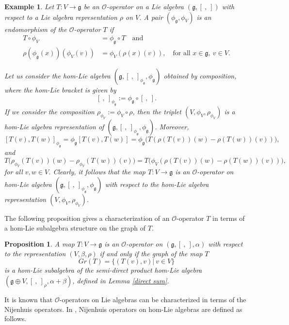 \documentclass[a4paper,11pt]{amsart}
\theoremstyle{plain}
\newtheorem{proposition}[theorem]{Proposition}
\newtheorem{example}[theorem]{Example}
\theoremstyle{definition}
\theoremstyle{remark}
\numberwithin{equation}{section}
\begin{document}
\begin{example}
Let $T:V\rightarrow \mathfrak{g}$ be an $\mathcal{O}$-operator on a Lie algebra $(\mathfrak{g},[~,~])$ with respect to a Lie algebra representation $\rho$ on $V$. A pair $(\phi_{\mathfrak{g}},\phi_V)$ is an endomorphism of the $\mathcal{O}$-operator $T$ if 
\begin{align*}
T\circ \phi_{V}&=\phi_{\mathfrak{g}}\circ T\quad \mbox{and}\\
\rho(\phi_{\mathfrak{g}}(x))(\phi_{V}(v))&=\phi_V(\rho(x)(v)), \quad \mbox{for all } x\in \mathfrak{g}, ~v\in V. 
\end{align*}

 Let us consider the hom-Lie algebra $(\mathfrak{g},[~,~]_{\phi_\mathfrak{g}},\phi_{\mathfrak{g}})$ obtained by composition, where the hom-Lie bracket is given by 
  $$[~,~]_{\phi_\mathfrak{g}}:=\phi_{\mathfrak{g}}\circ [~,~].$$ 
If we consider the composition $\rho_{\phi_V}:=\phi_V\circ \rho$, then the triplet $(V,\phi_V,\rho_{\phi_V})$ is a hom-Lie algebra representation of $(\mathfrak{g},[~,~]_{\phi_\mathfrak{g}},\phi_{\mathfrak{g}})$. Moreover, 
$$[T(v),T(w)]_{\phi_\mathfrak{g}}=\phi_{\mathfrak{g}}[T(v),T(w)]=\phi_{\mathfrak{g}}\big(T(\rho(T(v))(w)-\rho(T(w))(v))\big),$$
and 
$$T\big(\rho_{\phi_V}(T(v))(w)-\rho_{\phi_V}(T(w))(v)\big)=T\big(\phi_V(\rho(T(v))(w)-\rho(T(w))(v))\big), $$
for all $v,w \in V$. Clearly, it follows that the map $T:V\rightarrow \mathfrak{g}$ is an $\mathcal{O}$-operator on hom-Lie algebra $(\mathfrak{g},[~,~]_{\phi_\mathfrak{g}},\phi_{\mathfrak{g}})$ with respect to the hom-Lie algebra representation $(V,\phi_V,\rho_{\phi_V})$.
\end{example}

The following proposition gives a characterization of an $\mathcal{O}$-operator $T$ in terms of a hom-Lie subalgebra structure on the graph of $T$.

\begin{proposition}
A map $T:V\rightarrow \mathfrak{g}$ is an $\mathcal{O}$-operator on $(\mathfrak{g},[~,~],\alpha)$ with respect to the representation $(V,\beta,\rho)$ if and only if the graph of the map $T$ $$Gr(T)=\{(T(v),v)|~v\in V\}$$
is a  hom-Lie subalgebra of the semi-direct product hom-Lie algebra $(\mathfrak{g}\oplus V,[~,~]_{\rho},\alpha+\beta)$, defined in Lemma \ref{direct sum}.
\end{proposition}

It is known that $\mathcal{O}$-operators on Lie algebras can be characterized in terms of the Nijenhuis operators. In \cite{Sheng}, Nijenhuis operators on hom-Lie algebras are defined as follows.
\end{document}
